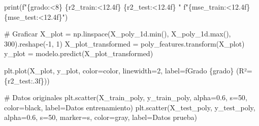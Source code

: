 \documentclass[
  doc,
  floatsintext,
  longtable,
  a4paper,
  nolmodern,
  notxfonts,
  notimes,
  12pt,
  colorlinks=true,linkcolor=blue,citecolor=blue,urlcolor=blue]{apa7}
\newenvironment{Shaded}{\begin{snugshade}}{\end{snugshade}}
\newcommand{\BuiltInTok}[1]{\textcolor[rgb]{0.00,0.23,0.31}{#1}}
\newcommand{\CommentTok}[1]{\textcolor[rgb]{0.37,0.37,0.37}{#1}}
\newcommand{\DecValTok}[1]{\textcolor[rgb]{0.68,0.00,0.00}{#1}}
\newcommand{\FloatTok}[1]{\textcolor[rgb]{0.68,0.00,0.00}{#1}}
\newcommand{\NormalTok}[1]{\textcolor[rgb]{0.00,0.23,0.31}{#1}}
\newcommand{\OperatorTok}[1]{\textcolor[rgb]{0.37,0.37,0.37}{#1}}
\newcommand{\SpecialCharTok}[1]{\textcolor[rgb]{0.37,0.37,0.37}{#1}}
\newcommand{\SpecialStringTok}[1]{\textcolor[rgb]{0.13,0.47,0.30}{#1}}
\newcommand{\StringTok}[1]{\textcolor[rgb]{0.13,0.47,0.30}{#1}}
\begin{document}
\begin{Shaded}
\begin{Highlighting}[]
    \BuiltInTok{print}\NormalTok{(}\SpecialStringTok{f"}\SpecialCharTok{\{}\NormalTok{grado}\SpecialCharTok{:\textless{}8\}}\SpecialStringTok{ }\SpecialCharTok{\{}\NormalTok{r2\_train}\SpecialCharTok{:\textless{}12.4f\}}\SpecialStringTok{ }\SpecialCharTok{\{}\NormalTok{r2\_test}\SpecialCharTok{:\textless{}12.4f\}}\SpecialStringTok{ "}
          \SpecialStringTok{f"}\SpecialCharTok{\{}\NormalTok{mse\_train}\SpecialCharTok{:\textless{}12.4f\}}\SpecialStringTok{ }\SpecialCharTok{\{}\NormalTok{mse\_test}\SpecialCharTok{:\textless{}12.4f\}}\SpecialStringTok{"}\NormalTok{)}
    
    \CommentTok{\# Graficar}
\NormalTok{    X\_plot }\OperatorTok{=}\NormalTok{ np.linspace(X\_poly\_1d.}\BuiltInTok{min}\NormalTok{(), X\_poly\_1d.}\BuiltInTok{max}\NormalTok{(), }\DecValTok{300}\NormalTok{).reshape(}\OperatorTok{{-}}\DecValTok{1}\NormalTok{, }\DecValTok{1}\NormalTok{)}
\NormalTok{    X\_plot\_transformed }\OperatorTok{=}\NormalTok{ poly\_features.transform(X\_plot)}
\NormalTok{    y\_plot }\OperatorTok{=}\NormalTok{ modelo.predict(X\_plot\_transformed)}
    
\NormalTok{    plt.plot(X\_plot, y\_plot, color}\OperatorTok{=}\NormalTok{color, linewidth}\OperatorTok{=}\DecValTok{2}\NormalTok{, }
\NormalTok{             label}\OperatorTok{=}\SpecialStringTok{f\textquotesingle{}Grado }\SpecialCharTok{\{}\NormalTok{grado}\SpecialCharTok{\}}\SpecialStringTok{ (R²=}\SpecialCharTok{\{}\NormalTok{r2\_test}\SpecialCharTok{:.3f\}}\SpecialStringTok{)\textquotesingle{}}\NormalTok{)}

\CommentTok{\# Datos originales}
\NormalTok{plt.scatter(X\_train\_poly, y\_train\_poly, alpha}\OperatorTok{=}\FloatTok{0.6}\NormalTok{, s}\OperatorTok{=}\DecValTok{50}\NormalTok{, }
\NormalTok{           color}\OperatorTok{=}\StringTok{\textquotesingle{}black\textquotesingle{}}\NormalTok{, label}\OperatorTok{=}\StringTok{\textquotesingle{}Datos entrenamiento\textquotesingle{}}\NormalTok{)}
\NormalTok{plt.scatter(X\_test\_poly, y\_test\_poly, alpha}\OperatorTok{=}\FloatTok{0.6}\NormalTok{, s}\OperatorTok{=}\DecValTok{50}\NormalTok{, }
\NormalTok{           marker}\OperatorTok{=}\StringTok{\textquotesingle{}s\textquotesingle{}}\NormalTok{, color}\OperatorTok{=}\StringTok{\textquotesingle{}gray\textquotesingle{}}\NormalTok{, label}\OperatorTok{=}\StringTok{\textquotesingle{}Datos prueba\textquotesingle{}}\NormalTok{)}


\end{Highlighting}
\end{Shaded}
\end{document}
